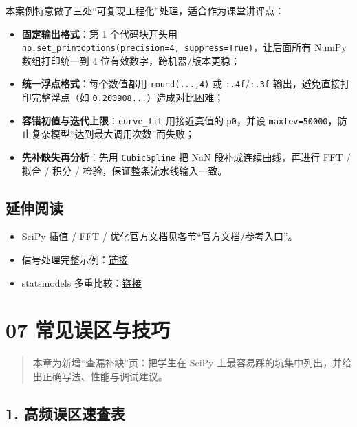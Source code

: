 本案例特意做了三处``可复现工程化''处理，适合作为课堂讲评点：

\begin{itemize}
\tightlist
\item
  \textbf{固定输出格式}：第 1 个代码块开头用
  \texttt{np.set\_printoptions(precision=4,\ suppress=True)}，让后面所有
  NumPy 数组打印统一到 4 位有效数字，跨机器/版本更稳；
\item
  \textbf{统一浮点格式}：每个数值都用 \texttt{round(...,4)} 或
  \texttt{:.4f}/\texttt{:.3f} 输出，避免直接打印完整浮点（如
  \texttt{0.200908...}）造成对比困难；
\item
  \textbf{容错初值与迭代上限}：\texttt{curve\_fit} 用接近真值的
  \texttt{p0}，并设
  \texttt{maxfev=50000}，防止复杂模型``达到最大调用次数''而失败；
\item
  \textbf{先补缺失再分析}：先用 \texttt{CubicSpline} 把 NaN
  段补成连续曲线，再进行 FFT / 拟合 / 积分 /
  检验，保证整条流水线输入一致。
\end{itemize}

\subsection{延伸阅读}\label{ux5ef6ux4f38ux9605ux8bfb-15}

\begin{itemize}
\tightlist
\item
  SciPy 插值 / FFT / 优化官方文档见各节``官方文档/参考入口''。
\item
  信号处理完整示例：\href{https://docs.scipy.org/doc/scipy/tutorial/fft.html}{链接}
\item
  statsmodels
  多重比较：\href{https://www.statsmodels.org/stable/stats.html}{链接}
\end{itemize}

\section{07
常见误区与技巧}\label{ux5e38ux89c1ux8befux533aux4e0eux6280ux5de7-2}

\begin{quote}
本章为新增``查漏补缺''页：把学生在 SciPy
上最容易踩的坑集中列出，并给出正确写法、性能与调试建议。
\end{quote}

\subsection{1.
高频误区速查表}\label{ux9ad8ux9891ux8befux533aux901fux67e5ux8868-2}

